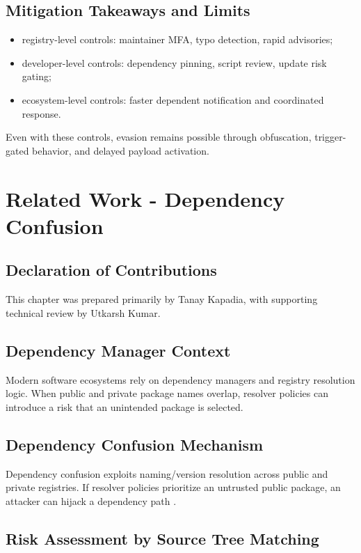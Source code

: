 \section{Mitigation Takeaways and Limits}

\begin{itemize}
\item registry-level controls: maintainer MFA, typo detection, rapid advisories;
\item developer-level controls: dependency pinning, script review, update risk gating;
\item ecosystem-level controls: faster dependent notification and coordinated response.
\end{itemize}

Even with these controls, evasion remains possible through obfuscation,
trigger-gated behavior, and delayed payload activation.

\chapter{Related Work - Dependency Confusion}
\label{ch:related-dependency-confusion}

\section*{Declaration of Contributions}
This chapter was prepared primarily by Tanay Kapadia,
with supporting technical review by Utkarsh Kumar.

\section{Dependency Manager Context}

Modern software ecosystems rely on dependency managers and registry resolution logic.
When public and private package names overlap, resolver policies can introduce a risk
that an unintended package is selected.

\section{Dependency Confusion Mechanism}

Dependency confusion exploits naming/version resolution across public and private registries.
If resolver policies prioritize an untrusted public package, an attacker can hijack a
dependency path \citep{birsan2021dependencyconfusion}.

\section{Risk Assessment by Source Tree Matching}

